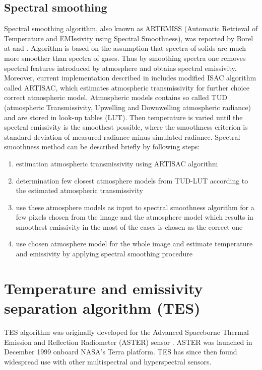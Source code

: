 \subsection*{Spectral smoothing}

Spectral smoothing algorithm, also known as ARTEMISS (Automatic Retrieval of Temperature and EMIssivity using Spectral Smoothness), was reported by Borel at \cite{B98} and \cite{B08}. Algorithm is based on the assumption that spectra of solids are much more smoother than spectra of gases. Thus by smoothing spectra one removes spectral features introduced by atmosphere and obtains spectral emissivity. Moreover, current implementation described in \cite{B08} includes modified ISAC algorithm called ARTISAC, which estimates atmospheric transmissivity for further choice correct atmospheric model. Atmospheric models contains so called TUD (atmospheric Transmissivity, Upwelling and Downwelling atmospheric radiance) and are stored in look-up tables (LUT). Then temperature is varied until the spectral emissivity is the smoothest possible, where the smoothness criterion is standard deviation of measured radiance minus simulated radiance. Spectral smoothness method can be described briefly by following steps:
\begin{enumerate}
	\item estimation atmospheric transmissivity using ARTISAC algorithm
	\item determination few closest atmosphere models from TUD-LUT according to the estimated atmospheric transmissivity
	\item use these atmosphere models as input to spectral smoothness algorithm for a few pixels chosen from the image and the atmosphere model which results in smoothest emissivity in the most of the cases is chosen as the correct one
	\item use chosen atmosphere model for the whole image and estimate temperature and emissivity by applying spectral smoothing procedure
\end{enumerate}

\section*{Temperature and emissivity separation algorithm (TES)}

TES algorithm was originally developed for the Advanced Spaceborne Thermal Emission and Reflection Radiometer (ASTER) sensor \cite{GR98}. ASTER was launched in December 1999 onboard NASA's Terra platform. TES has since then found widespread use with other multispectral and hyperspectral sensors.

